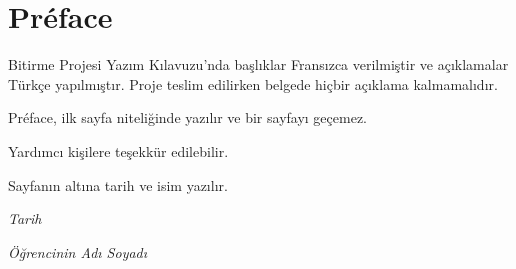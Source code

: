 \chapter{Préface}

Bitirme Projesi Yazım Kılavuzu’nda başlıklar Fransızca verilmiştir ve açıklamalar
Türkçe yapılmıştır. Proje teslim edilirken belgede hiçbir açıklama kalmamalıdır. 

Préface, ilk sayfa niteliğinde yazılır ve bir sayfayı geçemez.

Yardımcı kişilere teşekkür edilebilir.

Sayfanın altına tarih ve isim yazılır.


\bigskip
\hfill \textit{Tarih} \hspace{1cm}

\hfill \textit{Öğrencinin Adı Soyadı}

																				